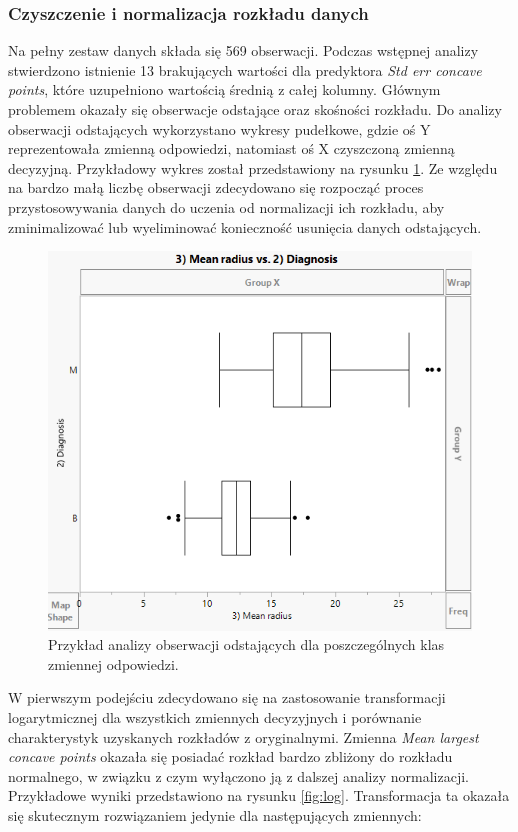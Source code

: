 	
	\subsubsection{Czyszczenie i normalizacja rozkładu danych}
	
	Na pełny zestaw danych składa się 569 obserwacji. Podczas wstępnej analizy stwierdzono istnienie 13 brakujących wartości dla predyktora \textit{Std err concave points}, które uzupełniono wartością średnią z całej kolumny. Głównym problemem okazały się obserwacje odstające oraz skośności rozkładu. Do analizy obserwacji odstających wykorzystano wykresy pudełkowe, gdzie oś Y reprezentowała zmienną odpowiedzi, natomiast oś X czyszczoną zmienną decyzyjną. Przykładowy wykres został przedstawiony na rysunku \ref{fig:boxgraph}. Ze względu na bardzo małą liczbę obserwacji zdecydowano się rozpocząć proces przystosowywania danych do uczenia od normalizacji ich rozkładu, aby zminimalizować lub wyeliminować konieczność usunięcia danych odstających. 
	
	\begin{figure}[!ht]
		\centering
		\includegraphics[width=0.7\linewidth]{Rysunki/Rozdzial2/box_graph}
		\caption{Przykład analizy obserwacji odstających dla poszczególnych klas zmiennej odpowiedzi.}
		\label{fig:boxgraph}
	\end{figure}
	
	W pierwszym podejściu zdecydowano się na zastosowanie transformacji logarytmicznej dla wszystkich zmiennych decyzyjnych i porównanie charakterystyk uzyskanych rozkładów z oryginalnymi. Zmienna \textit{Mean largest concave points} okazała się posiadać rozkład bardzo zbliżony do rozkładu normalnego, w związku z czym wyłączono ją z dalszej analizy normalizacji. Przykładowe wyniki przedstawiono na rysunku \ref{fig:log}. Transformacja ta okazała się skutecznym rozwiązaniem jedynie dla następujących zmiennych:
	
